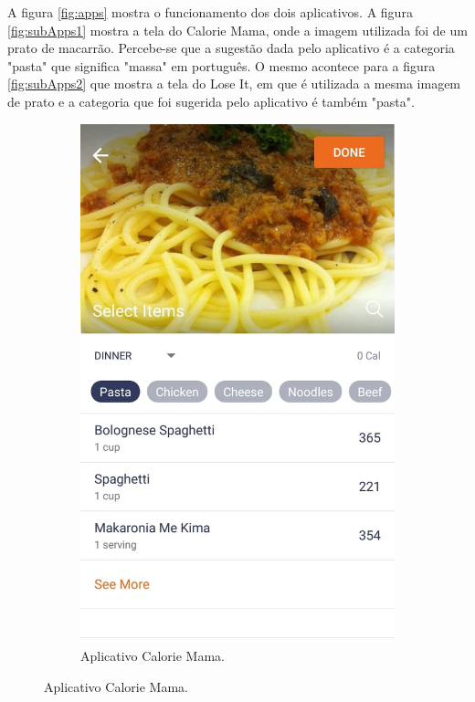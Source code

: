 A figura \ref{fig:apps} mostra o funcionamento dos dois aplicativos. A figura \ref{fig:subApps1} mostra a tela do Calorie Mama, onde a imagem utilizada foi de um prato de macarrão. Percebe-se que a sugestão dada pelo aplicativo é a categoria "pasta" que significa "massa" em português. O mesmo acontece para a figura \ref{fig:subApps2} que mostra a tela do Lose It, em que é utilizada a mesma imagem de prato e a categoria que foi sugerida pelo aplicativo é também "pasta".

\begin{figure}[!ht] 
\centering
\caption{Comparação entre os aplicativos.}
\label{fig:apps}
\begin{subfigure}{0.4\textwidth}
  \centering
    \caption{Aplicativo Calorie Mama.}
   \includegraphics[width=\textwidth]{imgs/mama.jpeg}

\end{subfigure}
\end{figure}
